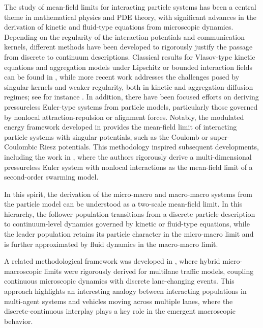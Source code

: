 \documentclass[10pt, reqno]{amsart}
\theoremstyle{definition}
\theoremstyle{remark}
\numberwithin{equation}{section}
\begin{document}
The study of mean-field limits for interacting particle systems has been a central theme in mathematical physics and PDE theory, with significant advances in the derivation of kinetic and fluid-type equations from microscopic dynamics. Depending on the regularity of the interaction potentials and communication kernels, different methods have been developed to rigorously justify the passage from discrete to continuum descriptions. Classical results for Vlasov-type kinetic equations and aggregation models under Lipschitz or bounded interaction fields can be found in \cite{BH, CCHS19, CFRT10, CFTV, CHL17, HL09, HT08, JW16, JW17, JW18, LP17, Spohn}, while more recent work addresses the challenges posed by singular kernels and weaker regularity, both in kinetic and aggregation-diffusion regimes; see for instance \cite{CCH14, CFI25, Deu16, HJ07, HJ15, S20}. In addition, there have been focused efforts on deriving pressureless Euler-type systems from particle models, particularly those governed by nonlocal attraction-repulsion or alignment forces. Notably, the modulated energy framework developed in \cite{S20} provides the mean-field limit of interacting particle systems with singular potentials, such as the Coulomb or super-Coulombic Riesz potentials. This methodology inspired subsequent developments, including the work in \cite{CC21}, where the authors rigorously derive a multi-dimensional pressureless Euler system with nonlocal interactions as the mean-field limit of a second-order swarming model.

In this spirit, the derivation of the micro-macro and macro-macro systems from the particle model can be understood as a two-scale mean-field limit. In this hierarchy, the follower population transitions from a discrete particle description to continuum-level dynamics governed by kinetic or fluid-type equations, while the leader population retains its particle character in the micro-macro limit and is further approximated by fluid dynamics in the macro-macro limit.

A related methodological framework was developed in \cite{piu1,piu2}, where hybrid micro-macroscopic limits were rigorously derived for multilane traffic models, coupling continuous microscopic dynamics with discrete lane-changing events. This approach highlights an interesting analogy between interacting populations in multi-agent systems and vehicles moving across multiple lanes, where the discrete-continuous interplay plays a key role in the emergent macroscopic behavior.
\end{document}
